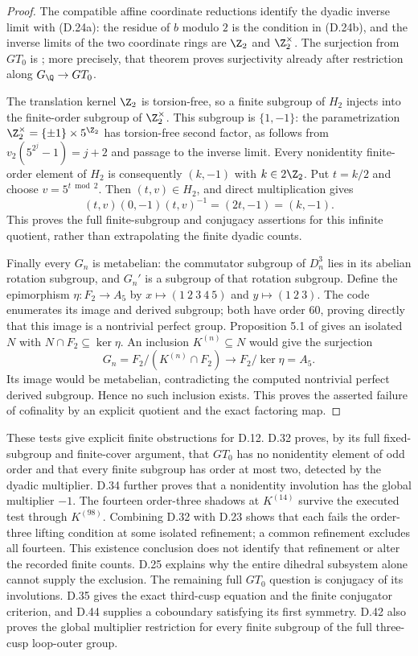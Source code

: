 \begin{proof}
The compatible affine coordinate reductions identify the dyadic
inverse limit with (D.24a): the residue of $b$ modulo $2$ is the
condition in (D.24b), and the inverse limits of the two coordinate
rings are $\Z_2$ and $\Z_2^\times$. The surjection from $GT_0$
is \cite[Theorem 5.7 and Proposition 5.8]{A-BDHPShadows}; more
precisely, that theorem proves surjectivity already after
restriction along $G_{\Q}\to GT_0$.

The translation kernel $\Z_2$ is torsion-free, so a finite
subgroup of $H_2$ injects into the finite-order subgroup of
$\Z_2^\times$. This subgroup is $\{1,-1\}$: the parametrization
$\Z_2^\times=\{\pm1\}\times5^{\Z_2}$ has torsion-free second
factor, as follows from
$v_2(5^{2^j}-1)=j+2$ and passage to the inverse limit.
Every nonidentity finite-order element of $H_2$ is consequently
$(k,-1)$ with $k\in2\Z_2$. Put $t=k/2$ and choose
$v=5^{t\bmod2}$. Then $(t,v)\in H_2$, and direct multiplication
gives
\[
 (t,v)(0,-1)(t,v)^{-1}=(2t,-1)=(k,-1).
\]
This proves the full finite-subgroup and conjugacy assertions
for this infinite quotient, rather than extrapolating the
finite dyadic counts.

Finally every $G_n$ is metabelian: the commutator subgroup of
$D_n^3$ lies in its abelian rotation subgroup, and $G_n'$ is
a subgroup of that rotation subgroup. Define the epimorphism
$\eta:F_2\to A_5$ by
$x\mapsto(1\ 2\ 3\ 4\ 5)$ and $y\mapsto(1\ 2\ 3)$.
The code enumerates its image and derived subgroup; both have
order $60$, proving directly that this image is a nontrivial
perfect group. Proposition 5.1 of \cite{A-DGShadows} gives an
isolated $N$ with $N\cap F_2\subseteq\ker\eta$.
An inclusion $K^{(n)}\subseteq N$ would give the surjection
\[
 G_n=F_2/(K^{(n)}\cap F_2)
   \longrightarrow F_2/\ker\eta=A_5.
\]
Its image would be metabelian, contradicting the computed
nontrivial perfect derived subgroup. Hence no such inclusion
exists. This proves the asserted failure of cofinality by an
explicit quotient and the exact factoring map.
\end{proof}

These tests give explicit finite obstructions for D.12.
D.32 proves, by its full fixed-subgroup and finite-cover argument,
that $GT_0$ has no nonidentity element of odd order and that every
finite subgroup has order at most two, detected by the dyadic
multiplier. D.34 further proves that a nonidentity involution
has the global multiplier $-1$.
The fourteen order-three shadows at $K^{(14)}$ survive the
executed test through $K^{(98)}$. Combining D.32 with D.23
shows that each fails the order-three lifting condition at some
isolated refinement; a common refinement excludes all fourteen.
This existence conclusion does not identify that refinement or
alter the recorded finite counts. D.25 explains why the entire
dihedral subsystem alone cannot supply the exclusion.
The remaining full $GT_0$ question is conjugacy of its
involutions. D.35 gives the exact third-cusp equation and the
finite conjugator criterion, and D.44 supplies a coboundary
satisfying its first symmetry. D.42 also proves the global
multiplier restriction for every finite subgroup of the full
three-cusp loop-outer group.
